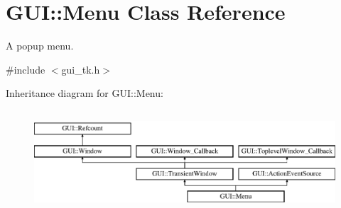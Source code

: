\hypertarget{classGUI_1_1Menu}{\section{G\-U\-I\-:\-:Menu Class Reference}
\label{classGUI_1_1Menu}
}


A popup menu.  




{\ttfamily \#include $<$gui\-\_\-tk.\-h$>$}

Inheritance diagram for G\-U\-I\-:\-:Menu\-:\begin{figure}[H]
\begin{center}
\leavevmode
\includegraphics[height=3.848797cm]{classGUI_1_1Menu}
\end{center}
\end{figure}
